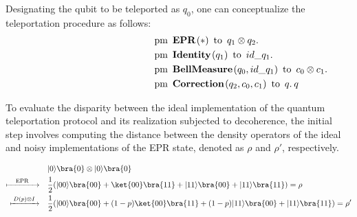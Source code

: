 Designating the qubit to be teleported as $q_0$, one can conceptualize the teleportation procedure as follows:
\begin{align*}
    \hspace{130 pt}& \text{pm} \hspace{5pt} \textbf{EPR}\hspace{1pt} (*) \hspace{5pt} \text{to} \hspace{5pt}  q_{1} \otimes q_{2}.  \notag \\
    & \text{pm}\hspace{5pt} \textbf{Identity} \hspace{1pt} (q_{1}) \hspace{5pt}  \text{to} \hspace{5pt} id\_q_{1}. \notag \\
    & \text{pm}\hspace{5pt} \textbf{BellMeasure} \hspace{1pt} (q_0,id\_q_{1}) \hspace{5pt}  \text{to} \hspace{5pt} c_{0}\otimes c_{1} . \notag \\
    & \text{pm} \hspace{5pt}  \textbf{Correction} \hspace{1pt} ( q_{2},  c_{0}, c_{1} ) \hspace{5pt} \text{to} \hspace{5pt}  q. \hspace{2pt}  q
\end{align*}

To evaluate the disparity between the ideal implementation of the quantum teleportation protocol and its realization subjected to decoherence, the initial step involves computing the distance between the density operators of the ideal and noisy implementations of the EPR state, denoted as $\rho$ and $\rho'$, respectively.

\begin{equation}
  \begin{split}
& |0\rangle \bra{0} \otimes |0\rangle \bra{0}  \\
\xmapsto{ \hspace{10pt} \text{EPR} \hspace{10pt} } \quad &  \frac{1}{2} (|00\rangle \bra{00} + \ket{00}\bra{11} + |11\rangle \bra{00} + |11\rangle \bra{11}) = \rho \\
\xmapsto{ \hspace{2pt} D(p) \otimes I  \hspace{2pt}} \quad &  \frac{1}{2} (|00\rangle \bra{00} + (1-p) \ket{00}\bra{11} + (1-p) |11\rangle \bra{00} + |11\rangle \bra{11} ) = \rho' \\
  \end{split}
\end{equation}

